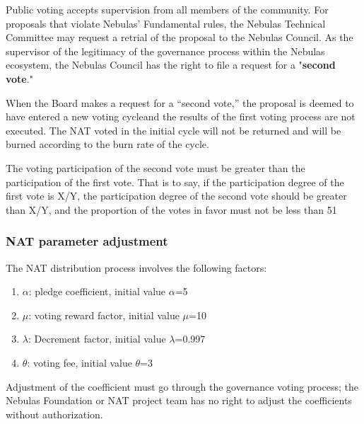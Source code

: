 Public voting accepts supervision from all members of the community. For proposals that violate Nebulas' Fundamental rules, the Nebulas Technical Committee may request a retrial of the proposal to the Nebulas Council. As the supervisor of the legitimacy of the governance process within the Nebulas ecosystem, the Nebulas Council has the right to file a request for a "\textbf{second vote}."

When the Board makes a request for a “second vote,” the proposal is deemed to have entered a new voting cycleand the results of the first voting process are not executed. The NAT voted in the initial cycle will not be returned and will be burned according to the burn rate of the cycle.

The voting participation of the second vote must be greater than the participation of the first vote. That is to say, if the participation degree of the first vote is X/Y, the participation degree of the second vote should be greater than X/Y, and the proportion of the votes in favor must not be less than 51%

\subsubsection{NAT parameter adjustment}

The NAT distribution process involves the following factors:

\begin{enumerate}
	\item $\alpha$: pledge coefficient, initial value $\alpha$=5
	\item $\mu$: voting reward factor, initial value $\mu$=10
	\item $\lambda$: Decrement factor, initial value $\lambda$=0.997
	\item $\theta$: voting fee, initial value $\theta$=3
\end{enumerate}

Adjustment of the coefficient must go through the governance voting process; the Nebulas Foundation or NAT project team has no right to adjust the coefficients without authorization.

